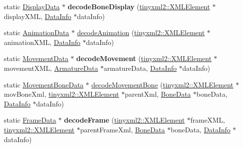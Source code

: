 \begin{DoxyCompactItemize}
\item 
\mbox{\label{classcocostudio_1_1DataReaderHelper_a0b782048d3349c883757336e19474606}} 
static \hyperlink{classcocostudio_1_1DisplayData}{Display\+Data} $\ast$ {\bfseries decode\+Bone\+Display} (\hyperlink{classtinyxml2_1_1XMLElement}{tinyxml2\+::\+X\+M\+L\+Element} $\ast$display\+X\+ML, \hyperlink{structcocostudio_1_1DataReaderHelper_1_1__DataInfo}{Data\+Info} $\ast$data\+Info)
\item 
static \hyperlink{classcocostudio_1_1AnimationData}{Animation\+Data} $\ast$ \hyperlink{classcocostudio_1_1DataReaderHelper_ab812fe6a19b59203fa3984b34158c592}{decode\+Animation} (\hyperlink{classtinyxml2_1_1XMLElement}{tinyxml2\+::\+X\+M\+L\+Element} $\ast$animation\+X\+ML, \hyperlink{structcocostudio_1_1DataReaderHelper_1_1__DataInfo}{Data\+Info} $\ast$data\+Info)
\item 
\mbox{\label{classcocostudio_1_1DataReaderHelper_ae297108b2104e95544db5317c4270784}} 
static \hyperlink{classcocostudio_1_1MovementData}{Movement\+Data} $\ast$ {\bfseries decode\+Movement} (\hyperlink{classtinyxml2_1_1XMLElement}{tinyxml2\+::\+X\+M\+L\+Element} $\ast$movement\+X\+ML, \hyperlink{classcocostudio_1_1ArmatureData}{Armature\+Data} $\ast$armature\+Data, \hyperlink{structcocostudio_1_1DataReaderHelper_1_1__DataInfo}{Data\+Info} $\ast$data\+Info)
\item 
static \hyperlink{classcocostudio_1_1MovementBoneData}{Movement\+Bone\+Data} $\ast$ \hyperlink{classcocostudio_1_1DataReaderHelper_a61dbb1c834a89dee7054fedd716f226c}{decode\+Movement\+Bone} (\hyperlink{classtinyxml2_1_1XMLElement}{tinyxml2\+::\+X\+M\+L\+Element} $\ast$mov\+Bone\+Xml, \hyperlink{classtinyxml2_1_1XMLElement}{tinyxml2\+::\+X\+M\+L\+Element} $\ast$parent\+Xml, \hyperlink{classcocostudio_1_1BoneData}{Bone\+Data} $\ast$bone\+Data, \hyperlink{structcocostudio_1_1DataReaderHelper_1_1__DataInfo}{Data\+Info} $\ast$data\+Info)
\item 
\mbox{\label{classcocostudio_1_1DataReaderHelper_a35b8807142860033bf809e1ab5dc8814}} 
static \hyperlink{classcocostudio_1_1FrameData}{Frame\+Data} $\ast$ {\bfseries decode\+Frame} (\hyperlink{classtinyxml2_1_1XMLElement}{tinyxml2\+::\+X\+M\+L\+Element} $\ast$frame\+X\+ML, \hyperlink{classtinyxml2_1_1XMLElement}{tinyxml2\+::\+X\+M\+L\+Element} $\ast$parent\+Frame\+Xml, \hyperlink{classcocostudio_1_1BoneData}{Bone\+Data} $\ast$bone\+Data, \hyperlink{structcocostudio_1_1DataReaderHelper_1_1__DataInfo}{Data\+Info} $\ast$data\+Info)

\end{DoxyCompactItemize}
